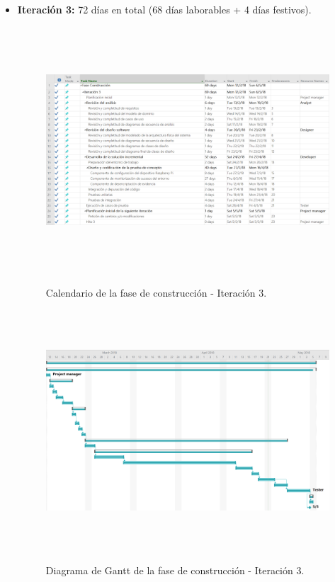 \documentclass[12pt,a4paper, twoside]{report}
\begin{document}
\begin{itemize}
		\item \textbf{Iteración 3:} 72 días en total (68 días laborables + 4 días festivos).
		
		\begin{figure}[!ht]   
			\caption{Calendario de la fase de construcción - Iteración 3.} 
			\begin{center} 
		 		\includegraphics[width=16cm,height=9.2cm]{Images/planning/iterations/It3_calendar} \\
				\label{fig:planning-it3-calendar} 
			\end{center}  
		\end{figure}  
		
		\begin{figure}[!ht]   
			\caption{Diagrama de Gantt de la fase de construcción - Iteración 3.} 
			\begin{center} 
		 		\includegraphics[width=16cm,height=9cm]{Images/planning/iterations/It3_gantt} \\
				\label{fig:planning-it3-gantt} 
			\end{center}  
		\end{figure}  
		

\end{itemize}
\end{document}
